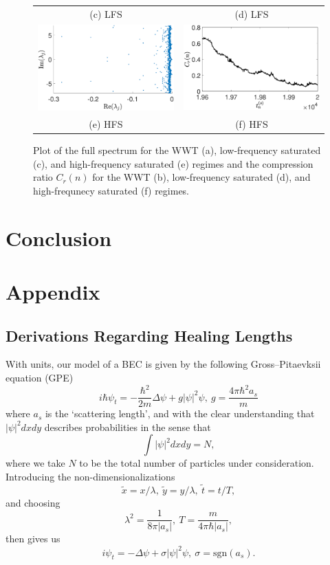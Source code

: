 \documentclass[aps,prl,preprint,groupedaddress]{revtex4-1}
\begin{document}
\begin{figure}[!ht]
\begin{tabular}{cc}
(c) LFS & (d) LFS\\
\includegraphics[width=.525\textwidth]{full_spec_hf_K_256_Lx_128_tf_2e4} &\hspace{-25pt} \includegraphics[width=.525\textwidth]{cratio_hfforce_K_256_Lx_128_tf_2e4}\\
(e) HFS & (f) HFS
\end{tabular}
\caption{Plot of the full spectrum for the WWT (a), low-frequency saturated (c), and high-frequency saturated (e) regimes and the compression ratio $C_{r}(n)$ for the WWT (b), low-frequency saturated (d), and high-frequnecy saturated (f) regimes.}
\label{fig:comprats}
\end{figure}

\section*{Conclusion}

\section*{Appendix}
\subsection*{Derivations Regarding Healing Lengths}
With units, our model of a BEC is given by the following Gross--Pitaevksii equation (GPE)
\[
i\hbar\psi_{t} = -\frac{\hbar^{2}}{2m}\Delta \psi + g\left| \psi\right|^{2}\psi, ~ g = \frac{4\pi \hbar^{2}a_{s}}{m}
\]
where $a_{s}$ is the `scattering length', and with the clear understanding that $\left|\psi\right|^{2}dxdy$ describes probabilities in the sense that 
\[
\int |\psi|^{2}dxdy = N,
\]
where we take $N$ to be the total number of particles under consideration.  Introducing the non-dimensionalizations 
\[
\tilde{x} = x/\lambda, ~ \tilde{y} = y/\lambda, ~ \tilde{t} = t/T, 
\]
and choosing
\[
\lambda^{2} = \frac{1}{8\pi |a_{s}|}, ~ T = \frac{m}{4\pi\hbar |a_{s}|}, 
\] 
then gives us
\[
i\psi_{t} = -\Delta \psi + \sigma\left| \psi\right|^{2}\psi,  ~\sigma = \mbox{sgn}(a_{s}).
\]



\end{document}
